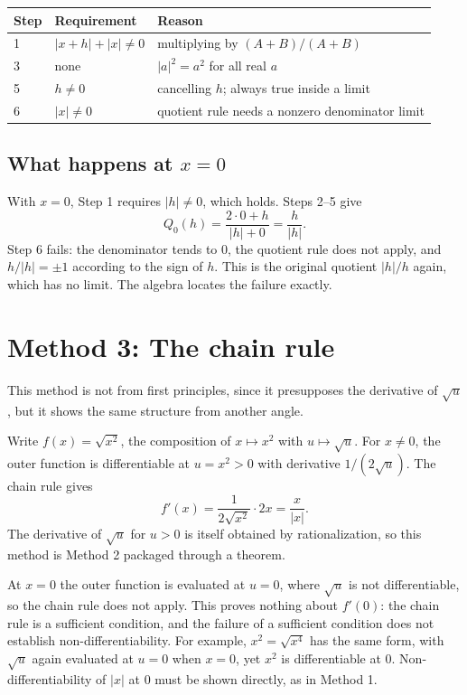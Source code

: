 \documentclass{essay}
\newcommand{\abs}[1]{\lvert #1 \rvert}
\begin{document}
\begin{center}
  \begin{tabular}{lll}
    Step & Requirement & Reason \\
    \hline
    1 & $\abs{x+h} + \abs{x} \neq 0$ & multiplying by $(A+B)/(A+B)$ \\
    3 & none & $\abs{a}^2 = a^2$ for all real $a$ \\
    5 & $h \neq 0$ & cancelling $h$; always true inside a limit \\
    6 & $\abs{x} \neq 0$ & quotient rule needs a nonzero denominator limit \\
  \end{tabular}
\end{center}

\subsection{What happens at $x = 0$}

With $x = 0$, Step 1 requires $\abs{h} \neq 0$, which holds. Steps 2--5 give
\[
  Q_0(h) = \frac{2 \cdot 0 + h}{\abs{h} + 0} = \frac{h}{\abs{h}}.
\]
Step 6 fails: the denominator tends to $0$, the quotient rule does not apply,
and $h / \abs{h} = \pm 1$ according to the sign of $h$. This is the original
quotient $\abs{h}/h$ again, which has no limit. The algebra locates the failure
exactly.

\section{Method 3: The chain rule}

This method is not from first principles, since it presupposes the derivative
of $\sqrt{u}$, but it shows the same structure from another angle.

Write $f(x) = \sqrt{x^2}$, the composition of $x \mapsto x^2$ with
$u \mapsto \sqrt{u}$. For $x \neq 0$, the outer function is differentiable at
$u = x^2 > 0$ with derivative $1/(2\sqrt{u})$. The chain rule gives
\[
  f'(x) = \frac{1}{2\sqrt{x^2}} \cdot 2x = \frac{x}{\abs{x}}.
\]
The derivative of $\sqrt{u}$ for $u > 0$ is itself obtained by rationalization,
so this method is Method 2 packaged through a theorem.

At $x = 0$ the outer function is evaluated at $u = 0$, where $\sqrt{u}$ is not
differentiable, so the chain rule does not apply. This proves nothing about
$f'(0)$: the chain rule is a sufficient condition, and the failure of a
sufficient condition does not establish non-differentiability. For example,
$x^2 = \sqrt{x^4}$ has the same form, with $\sqrt{u}$ again evaluated at
$u = 0$ when $x = 0$, yet $x^2$ is differentiable at $0$. Non-differentiability
of $\abs{x}$ at $0$ must be shown directly, as in Method 1.
\end{document}
